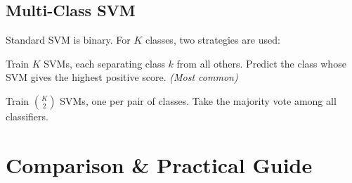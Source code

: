 \documentclass[12pt,a4paper]{article}
\begin{document}
\subsection{Multi-Class SVM}

Standard SVM is binary. For $K$ classes, two strategies are used:

\begin{tcolorbox}[defbox, title={Multi-Class SVM Strategies}]
\begin{description}[leftmargin=2.5em, style=nextline]
  \item[\textbf{One-vs-Rest (OvR):}] Train $K$ SVMs, each separating class $k$ from all others. Predict the class whose SVM gives the highest positive score. \textit{(Most common)}
  \item[\textbf{One-vs-One (OvO):}] Train $\binom{K}{2}$ SVMs, one per pair of classes. Take the majority vote among all classifiers.
\end{description}
\end{tcolorbox}

\section{Comparison \& Practical Guide}
\end{document}
